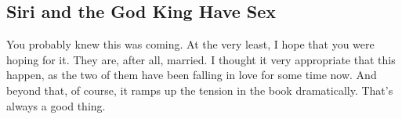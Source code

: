 \subsection*{Siri and the God King Have Sex}

You probably knew this was coming. At the very least, I hope that you were hoping for it. They are, after all, married. I thought it very appropriate that this happen, as the two of them have been falling in love for some time now. And beyond that, of course, it ramps up the tension in the book dramatically. That’s always a good thing.



